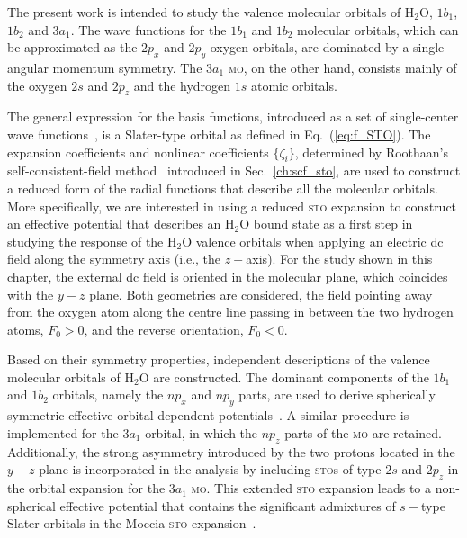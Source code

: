The present work is intended to study the valence molecular orbitals
of H$_{2}$O, $1b_{1}$, $1b_{2}$ and $3a_{1}$. The wave functions for
the $1b_{1}$ and $1b_{2}$ molecular orbitals, which can be
approximated as the $2p_{x}$ and $2p_{y}$ oxygen orbitals, are
dominated by a single angular momentum symmetry. The $3a_{1}$
\textsc{mo}, on the other hand, consists mainly of the oxygen $2s$ and
$2p_{z}$ and the hydrogen $1s$ atomic orbitals.

The general expression for the basis functions, introduced as a set of
single-center wave
functions~\cite{Moccia_1964,Moccia_JCP_2164,Moccia_JCP_2176}, is a
Slater-type orbital as defined in Eq.~(\ref{eq:f_STO}). The expansion
coefficients and nonlinear coefficients $\{\zeta_{i}\}$, determined by
Roothaan's self-consistent-field
method~\cite{Moccia_1964,Roothaan_1951} introduced in
Sec.~\ref{ch:scf_sto}, are used to construct a reduced form of the
radial functions that describe all the molecular orbitals. More
specifically, we are interested in using a reduced \textsc{sto}
expansion to construct an effective potential that describes an
H$_{2}$O bound state as a first step in studying the response of the
H$_{2}$O valence orbitals when applying an electric dc field along the
symmetry axis (i.e., the $z-$axis). For the study shown in this
chapter, the external dc field is oriented in the molecular plane,
which coincides with the $y-z$ plane. Both geometries are considered,
the field pointing away from the oxygen atom along the centre line
passing in between the two hydrogen atoms, $F_{0} > 0$, and the
reverse orientation, $F_{0} < 0$.

Based on their symmetry properties, independent descriptions of the
valence molecular orbitals of H$_{2}$O are constructed. The dominant
components of the $1b_{1}$ and $1b_{2}$ orbitals, namely the $np_{x}$
and $np_{y}$ parts, are used to derive spherically symmetric effective
orbital-dependent potentials~\cite{sarias_2016}. A similar procedure
is implemented for the $3a_{1}$ orbital, in which the $np_{z}$ parts
of the \textsc{mo} are retained. Additionally, the strong asymmetry
introduced by the two protons located in the $y-z$ plane is
incorporated in the analysis by including \textsc{sto}s of type $2s$
and $2p_{z}$ in the orbital expansion for the $3a_{1}$
\textsc{mo}. This extended \textsc{sto} expansion leads to a
non-spherical effective potential that contains the significant
admixtures of $s-$type Slater orbitals in the Moccia \textsc{sto}
expansion~\cite{Moccia_1964}.
 



